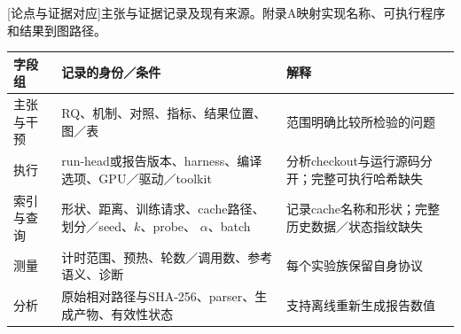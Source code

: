 \par\medskip\noindent\begin{minipage}{\linewidth}
\centering\captionsetup{hypcap=false}
[论点与证据对应]{主张与证据记录及现有来源。附录A映射实现名称、可执行程序和结果到图路径。}
\label{tab:3-ledger}
\footnotesize\setlength{\tabcolsep}{4pt}
\begin{tabularx}{\linewidth}{@{}p{.24\linewidth}XX@{}}
\toprule
字段组 & 记录的身份／条件 & 解释 \\
\midrule
主张与干预 & RQ、机制、对照、指标、结果位置、图／表 & 范围明确比较所检验的问题 \\
执行 & run-head或报告版本、harness、编译选项、GPU／驱动／toolkit
& 分析checkout与运行源码分开；完整可执行哈希缺失 \\
索引与查询 & 形状、距离、训练请求、cache路径、划分／seed、$k$、probe、
$\alpha$、batch & 记录cache名称和形状；完整历史数据／状态指纹缺失 \\
测量 & 计时范围、预热、轮数／调用数、参考语义、诊断 & 每个实验族保留自身协议 \\
分析 & 原始相对路径与SHA-256、parser、生成产物、有效性状态
& 支持离线重新生成报告数值 \\
\bottomrule
\end{tabularx}
\end{minipage}\par\medskip
